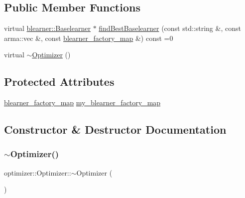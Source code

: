 \subsection*{Public Member Functions}
\begin{DoxyCompactItemize}
\item 
virtual \mbox{\hyperlink{classblearner_1_1_baselearner}{blearner\+::\+Baselearner}} $\ast$ \mbox{\hyperlink{classoptimizer_1_1_optimizer_a134c7b34ed868231fbab53e9ebfa8fd8}{find\+Best\+Baselearner}} (const std\+::string \&, const arma\+::vec \&, const \mbox{\hyperlink{baselearner__factory__list_8h_a058570e00ae11b882cfed36eb40be025}{blearner\+\_\+factory\+\_\+map}} \&) const =0
\item 
virtual \mbox{\hyperlink{classoptimizer_1_1_optimizer_a7618771af9e91ff8367a02c5ff49a376}{$\sim$\+Optimizer}} ()
\end{DoxyCompactItemize}
\subsection*{Protected Attributes}
\begin{DoxyCompactItemize}
\item 
\mbox{\hyperlink{baselearner__factory__list_8h_a058570e00ae11b882cfed36eb40be025}{blearner\+\_\+factory\+\_\+map}} \mbox{\hyperlink{classoptimizer_1_1_optimizer_a93f8af0ef81986bc208cab5e3cc2ba31}{my\+\_\+blearner\+\_\+factory\+\_\+map}}
\end{DoxyCompactItemize}


\subsection{Constructor \& Destructor Documentation}
\mbox{\label{classoptimizer_1_1_optimizer_a7618771af9e91ff8367a02c5ff49a376}} 
\subsubsection{\texorpdfstring{$\sim$\+Optimizer()}{~Optimizer()}}
{\footnotesize\ttfamily optimizer\+::\+Optimizer\+::$\sim$\+Optimizer (\begin{DoxyParamCaption}{ }\end{DoxyParamCaption})\hspace{0.3cm}{\ttfamily [virtual]}}



